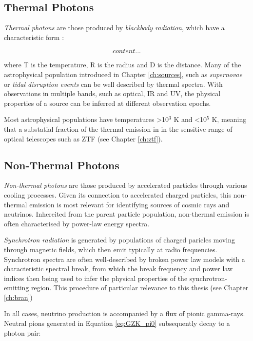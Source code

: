  \subsection*{Thermal Photons}
 
 \emph{Thermal photons} are those produced by \emph{blackbody radiation}, which have a characteristic form :
 
 \begin{equation}
 	content...
 \end{equation}

where T is the temperature, R is the radius and D is the distance. Many of the astrophysical population introduced in Chapter \ref{ch:sources}, such as \emph{supernovae} or \emph{tidal disruption events} can be well described by thermal spectra. With observations in multiple bands, such as optical, IR and UV, the physical properties of a source can be inferred at different observation epochs. 

Most astrophysical populations have temperatures >10$^{3}$ K and <10$^{5}$ K, meaning that a substatial fraction of the thermal emission in in the sensitive range of optical telescopes such as ZTF (see Chapter \ref{ch:ztf}). 

 \subsection*{Non-Thermal Photons}
 
\emph{Non-thermal photons} are those produced by accelerated particles through various cooling processes. Given its connection to accelerated charged particles, this non-thermal emission is most relevant for identifying sources of cosmic rays and neutrinos. Inhereited from the parent particle population, non-thermal emission is often characterised by power-law energy spectra.

\emph{Synchrotron radiation} is generated by populations of charged paricles moving through magnetic fields, which then emit typically at radio frequencies. Synchrotron spectra are often well-described by broken power law models with a characteristic spectral break, from which the break frequency and power law indices then being used to infer the physical properties of the synchrotron-emitting region.  This procedure of particular relevance to this thesis (see Chapter \ref{ch:bran}) 

In all cases, neutrino production is accompanied by a flux of pionic gamma-rays. Neutral pions generated in Equation \ref{eq:GZK_pi0} subsequently decay to a photon pair:

